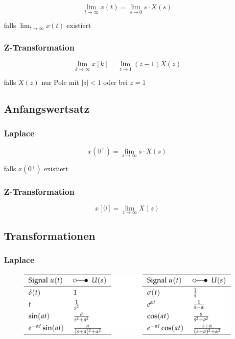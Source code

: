 \documentclass[
  10pt,
  a4paper,
]{article}
\numberwithin{equation}{section}
\begin{document}
\begin{multicols}{2}
\[
\lim_{t\rightarrow\infty}x(t)=\lim_{s\rightarrow0} s\cdot X(s)
\]

falls \(\lim_{t\rightarrow\infty} x(t)\) existiert

\hypertarget{z-transformation}{%
\subsubsection{Z-Transformation}\label{z-transformation}}

\[
\lim_{k\rightarrow\infty}x[k]=\lim_{z\rightarrow1}(z-1)X(z)
\]

falls \(X(z)\) nur Pole mit \(\lvert z\rvert < 1\) oder bei \(z=1\)

\hypertarget{anfangswertsatz}{%
\subsection{Anfangswertsatz}\label{anfangswertsatz}}

\hypertarget{laplace-1}{%
\subsubsection{Laplace}\label{laplace-1}}

\[
x(0^+)=\lim_{s\rightarrow\infty}s\cdot X(s)
\]

falls \(x(0^+)\) existiert

\hypertarget{z-transformation-1}{%
\subsubsection{Z-Transformation}\label{z-transformation-1}}

\[
x[0]=\lim_{z\rightarrow\infty}X(z)
\]

\hypertarget{transformationen}{%
\subsection{Transformationen}\label{transformationen}}

\hypertarget{laplace-2}{%
\subsubsection{Laplace}\label{laplace-2}}

\begin{figure}[H]

{\centering \includegraphics{images/paste-17.png}

}
\end{figure}
\end{multicols}
\end{document}
